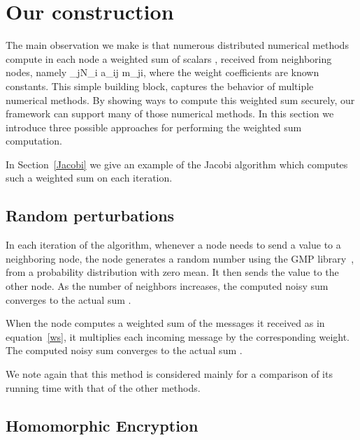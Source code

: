 \documentclass[times, 10pt,twocolumn]{article}
\begin{document}
\section{Our construction}
\label{const} The main observation we make is that numerous
distributed numerical methods compute in each node a weighted sum
of scalars , received from neighboring nodes, namely \BE
\label{ws} \sum_{j\in N_i} a_{ij} m_{ji}, \EE where the weight
coefficients   are known constants. This simple
building block, captures the behavior of multiple numerical
methods. By showing ways to compute this weighted sum securely,
our framework can support many of those numerical methods. In this
section we introduce three possible approaches for performing the
weighted sum computation.

In Section~\ref{Jacobi} we give an example of the Jacobi algorithm
which computes such a weighted sum on each iteration.
\subsection{Random perturbations}
 In each iteration of the algorithm, whenever a node
needs to send a value  to a neighboring node, the node
generates a random number  using the GMP
library~\cite{GMP}, from a probability distribution with zero
mean. It then sends the value  to the other node.
 As the number of neighbors increases,
the computed noisy sum 
converges to the actual sum .

When the node computes a weighted sum of the messages it received
as in equation~\ref{ws}, it multiplies each incoming message by
the corresponding weight. The computed noisy sum 
 converges to the
actual sum  .

We note again that this method is considered mainly for a comparison
of its  running
time with that of  the other methods.

\subsection{Homomorphic Encryption}
\end{document}

